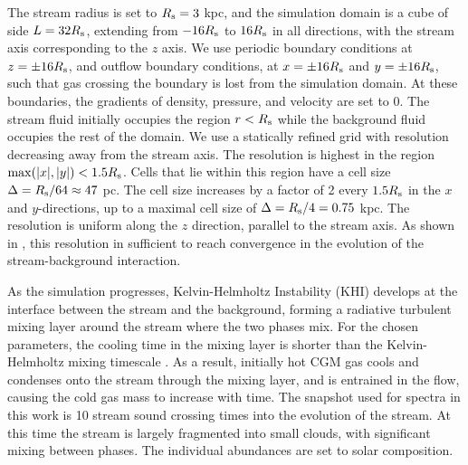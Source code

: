 \documentclass[fleqn,usenatbib]{mnras}
\begin{document}
The stream radius is set to $R_{\rm s}=3$ kpc, and the simulation domain is a cube of side $L=32R_{\rm s}$, extending from $-16R_{\rm s}$ to $16R_{\rm s}$ in all directions, with the stream axis corresponding to the $z$ axis.
We use periodic boundary conditions at $z=\pm 16R_{\rm s}$, and outflow boundary conditions, at $x=\pm 16R_{\rm s}$ and $y=\pm 16R_{\rm s}$, such that gas crossing the boundary is lost from the simulation domain.
At these boundaries, the gradients of density, pressure, and velocity are set to 0.
The stream fluid initially occupies the region $r<R_{\rm s}$ while the background fluid occupies the rest of the domain.
We use a statically refined grid with resolution decreasing away from the stream axis.
The resolution is highest in the region ${\rm max}(|x|,|y|)<1.5R_{\rm s}$.
Cells that lie within this region have a cell size $\Delta=R_{\rm s}/64\approx 47$ pc.
The cell size increases by a factor of 2 every $1.5R_{\rm s}$ in the $x$ and $y$-directions, up to a maximal cell size of $\Delta=R_{\rm s}/4=0.75$ kpc.
The resolution is uniform along the $z$ direction, parallel to the stream axis.
As shown in \cite{Mandelker2020a}, this resolution in sufficient to reach convergence in the evolution of the stream-background interaction.

As the simulation progresses, Kelvin-Helmholtz Instability (KHI) develops at the interface between the stream and the background, forming a radiative turbulent mixing layer around the stream where the two phases mix.
For the chosen parameters, the cooling time in the mixing layer is shorter than the Kelvin-Helmholtz mixing timescale \citep{Mandelker2020a}.
As a result, initially hot CGM gas cools and condenses onto the stream through the mixing layer, and is entrained in the flow, causing the cold gas mass to increase with time.
The snapshot used for spectra in this work is 10 stream sound crossing times into the evolution of the stream.
At this time the stream is largely fragmented into small clouds, with significant mixing between phases.
The individual abundances are set to solar composition.
\end{document}
